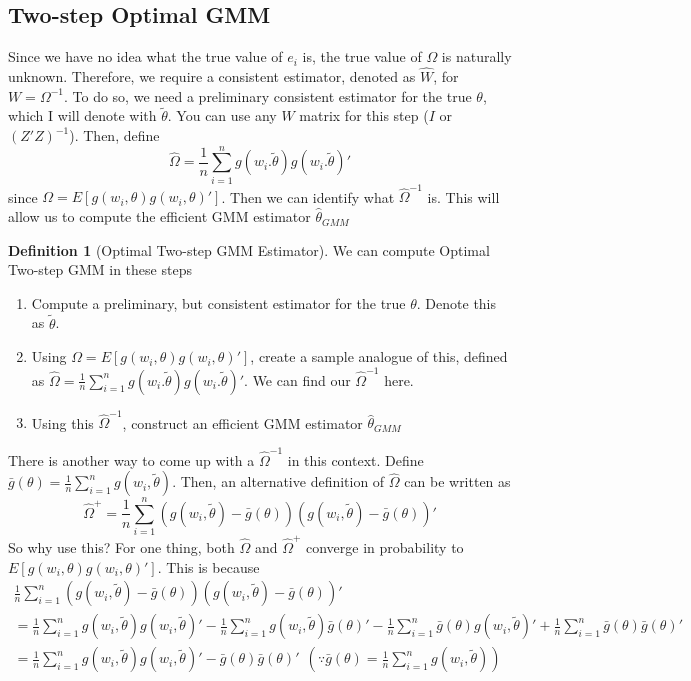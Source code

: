 \documentclass[12pt]{article}
\theoremstyle{definition}
\newtheorem{definition}{Definition}[section]
\theoremstyle{property}
\theoremstyle{assumption}
\theoremstyle{example}
\theoremstyle{comment}
\begin{document}
\subsection{Two-step Optimal GMM}
Since we have no idea what the true value of $e_i$ is, the true value of $\Omega$ is naturally unknown. Therefore, we require a consistent estimator, denoted as $\widehat{W}$, for $W=\Omega^{-1}$. To do so, we need a preliminary consistent estimator for the true $\theta$, which I will denote with $\tilde{\theta}$. You can use any $W$ matrix for this step ($I$ or $(Z'Z)^{-1}$). Then, define
\[
\widehat{\Omega}=\frac{1}{n}\sum_{i=1}^n g(w_i.\tilde{\theta})g(w_i.\tilde{\theta})'
\]
since $\Omega = E[g(w_i,\theta)g(w_i,\theta)']$. Then we can identify what $\widehat{\Omega}^{-1}$ is. This will allow us to compute the efficient GMM estimator $\hat{\theta}_{GMM}$
\begin{mdframed}[backgroundcolor=blue!5] 
\begin{definition}[Optimal Two-step GMM Estimator] We can compute Optimal Two-step GMM in these steps
\begin{enumerate}
\item Compute a preliminary, but consistent estimator for the true $\theta$. Denote this as $\tilde{\theta}$. 
\item Using $\Omega=E[g(w_i,\theta)g(w_i,\theta)']$, create a sample analogue of this, defined as $\widehat{\Omega}=\frac{1}{n}\sum_{i=1}^n g(w_i.\tilde{\theta})g(w_i.\tilde{\theta})'$. We can find our $\widehat{\Omega}^{-1}$ here. 
\item Using this $\widehat{\Omega}^{-1}$, construct an efficient GMM estimator $\hat{\theta}_{GMM}$
\end{enumerate}
\end{definition}
\end{mdframed}\par
There is another way to come up with a $\widehat{\Omega}^{-1}$ in this context. Define $\bar{g}(\theta)=\frac{1}{n}\sum_{i=1}^ng(w_i,\tilde{\theta})$. Then, an alternative definition of $\widehat{\Omega}$ can be written as
\[
\widehat{\Omega}^+=\frac{1}{n}\sum_{i=1}^n(g(w_i,\tilde{\theta})-\bar{g}(\theta))(g(w_i,\tilde{\theta})-\bar{g}(\theta))'
\]
So why use this? For one thing, both $\widehat{\Omega}$ and $\widehat{\Omega}^+$ converge in probability to $E[g(w_i,\theta)g(w_i,\theta)']$. This is because
\begin{gather*}
\frac{1}{n}\sum_{i=1}^n(g(w_i,\tilde{\theta})-\bar{g}(\theta))(g(w_i,\tilde{\theta})-\bar{g}(\theta))'\\
=\frac{1}{n}\sum_{i=1}^ng(w_i,\tilde{\theta})g(w_i,\tilde{\theta})'-\frac{1}{n}\sum_{i=1}^ng(w_i,\tilde{\theta})\bar{g}(\theta)'-\frac{1}{n}\sum_{i=1}^n\bar{g}(\theta)g(w_i,\tilde{\theta})'+\frac{1}{n}\sum_{i=1}^n \bar{g}(\theta)\bar{g}(\theta)'\\
=\frac{1}{n}\sum_{i=1}^ng(w_i,\tilde{\theta})g(w_i,\tilde{\theta})'- \bar{g}(\theta)\bar{g}(\theta)' \ \ \left(\because \bar{g}(\theta)=\frac{1}{n}\sum_{i=1}^ng(w_i,\tilde{\theta})\right)\\
\end{gather*}
\end{document}
